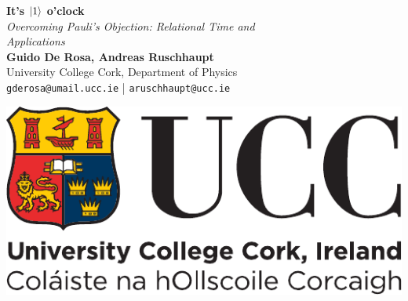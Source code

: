 \documentclass[a0,portrait]{a0poster}
\begin{document}

\begin{minipage}[c]{0.70\linewidth}
\VeryHuge \color{NavyBlue} \textbf{It's $\ket{1}$ o'clock} \color{Black}\\ %
\Huge\textit{Overcoming Pauli's Objection: Relational Time and \\Applications}\\[2cm] %
\huge \textbf{Guido De Rosa, Andreas Ruschhaupt}\\[0.5cm] %
\huge University College Cork, Department of Physics\\[0.4cm] %
\large%
\texttt{gderosa@umail.ucc.ie} | \texttt{aruschhaupt@ucc.ie}\\
\end{minipage}%
%
\begin{minipage}[t]{0.30\linewidth}
\includegraphics[width=19cm]{ucc_logo.pdf}\\  %
\end{minipage}

\vspace{0.4cm} %

\end{document}
